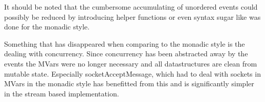 It should be noted that the cumbersome accumulating of unordered events could possibly be reduced by introducing helper functions or even syntax sugar like was done for the monadic style. 

Something that has disappeared when comparing to the monadic style is the dealing with concurrency. Since concurrency has been abstracted away by the events the MVars were no longer necessary and all datastructures are clean from mutable state.
Especially socketAcceptMessage, which had to deal with sockets in MVars in the monadic style has benefitted from this and is significantly simpler in the stream based implementation.
